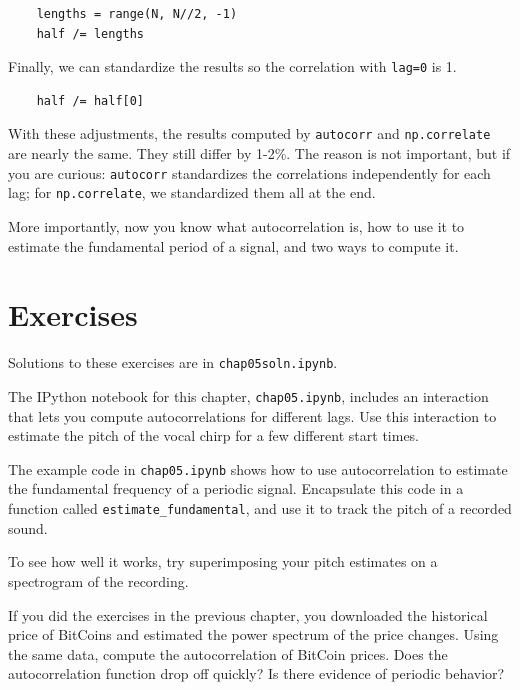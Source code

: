 \documentclass[12pt]{book}
\begin{document}
\begin{verbatim}
    lengths = range(N, N//2, -1)
    half /= lengths
\end{verbatim}

Finally, we can standardize the results so the correlation with
{\tt lag=0} is 1.

\begin{verbatim}
    half /= half[0]
\end{verbatim}

With these adjustments, the results computed by {\tt autocorr} and
{\tt np.correlate} are nearly the same.  They still differ by
1-2\%.  The reason is not important, but if you are curious: {\tt autocorr}
standardizes the correlations independently for each lag; for
{\tt np.correlate}, we standardized them all at the end.

More importantly, now you know what autocorrelation is, how to
use it to estimate the fundamental period of a signal, and two
ways to compute it.


\section{Exercises}

Solutions to these exercises are in {\tt chap05soln.ipynb}.

\begin{exercise}
The IPython notebook for this chapter, {\tt chap05.ipynb}, includes
an interaction that lets you compute autocorrelations for different
lags.  Use this interaction to estimate the pitch of the vocal chirp
for a few different start times.
\end{exercise}


\begin{exercise}
The example code in \verb"chap05.ipynb" shows how to use autocorrelation
to estimate the fundamental frequency of a periodic signal.
Encapsulate this code in a function called \verb"estimate_fundamental",
and use it to track the pitch of a recorded sound.

To see how well it works, try superimposing your pitch estimates on a
spectrogram of the recording.
\end{exercise}


\begin{exercise}
If you did the exercises in the previous chapter, you downloaded
the historical price of BitCoins and estimated the power spectrum
of the price changes.  Using the same data, compute the autocorrelation
of BitCoin prices.  Does the autocorrelation function drop off quickly?
Is there evidence of periodic behavior?
\end{exercise}
\end{document}
